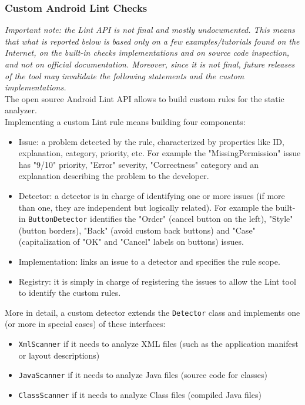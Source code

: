\documentclass[11pt,a4paper,notitlepage]{article}
\begin{document}
\subsubsection{Custom Android Lint Checks}
\textit{Important note: the Lint API is not final and mostly undocumented. This means that what is reported below is based only on a few examples/tutorials found on the Internet, on the built-in checks implementations and on source code inspection, and not on official documentation. Moreover, since it is not final, future releases of the tool may invalidate the following statements and the custom implementations.}\bigskip \\
The open source Android Lint API allows to build custom rules for the static analyzer.\medskip \\
Implementing a custom Lint rule means building four components:
\begin{itemize}
	\item Issue: a problem detected by the rule, characterized by properties like ID, explanation, category, priority, etc. For example the "MissingPermission" issue has "9/10" priority, "Error" severity, "Correctness" category and an explanation describing the problem to the developer.
	\item Detector: a detector is in charge of identifying one or more issues (if more than one, they are independent but logically related). For example the built-in \texttt{ButtonDetector} identifies the "Order" (cancel button on the left), "Style" (button borders), "Back" (avoid custom back buttons) and "Case" (capitalization of "OK" and "Cancel" labels on buttons) issues.
	\item Implementation: links an issue to a detector and specifies the rule scope.
	\item Registry: it is simply in charge of registering the issues to allow the Lint tool to identify the custom rules.
\end{itemize}\bigskip
More in detail, a custom detector extends the \texttt{Detector} class and implements one (or more in special cases) of these interfaces:
\begin{itemize}
	\item \texttt{XmlScanner} if it needs to analyze XML files (such as the application manifest or layout descriptions)
	\item \texttt{JavaScanner} if it needs to analyze Java files (source code for classes)
	\item \texttt{ClassScanner} if it needs to analyze Class files (compiled Java files)
\end{itemize}
\end{document}
